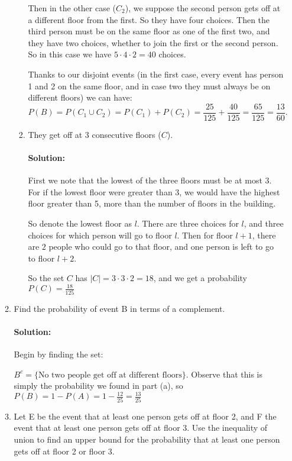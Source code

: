 \documentclass{article}
\begin{document}
\begin{enumerate}
\begin{enumerate}
\begin{enumerate}
                        Then in the other case ($C_2$), we suppose the second person gets off at a different floor from the first. So they have four choices. Then the third person must be on the same floor as one of the first two, and they have two choices, whether to join the first or the second person. So in this case we have $5\cdot 4\cdot 2=40$ choices.

                        Thanks to our disjoint events (in the first case, every event has person 1 and 2 on the same floor, and in case two they must always be on different floors) we can have:
                         \[
                        P(B)=P(C_1\cup C_2)=P(C_1)+P(C_2)=\frac{25}{125}+\frac{40}{125}=\frac{65}{125}=\frac{13}{60}
                        .\] 
                    \item They get off at 3 consecutive floors ($C$).
                        \paragraph{Solution: }First we note that the lowest of the three floors must be at most 3. For if the lowest floor were greater than 3, we would have the highest floor greater than 5, more than the number of floors in the building. 

                        So denote the lowest floor as $l$. There are three choices for $l$, and three choices for which person will go to floor $l$. Then for floor $l+1$, there are $2$ people who could go to that floor, and one person is left to go to floor $l+2$.

                        So the set $C$ has $|C|=3\cdot 3\cdot 2=18$, and we get a probability $P(C)=\frac{18}{125}$
                \end{enumerate}
            \item Find the probability of event B in terms of a complement.
                \paragraph{Solution: }Begin by finding the set: 

                $B^{c}=\{\text{No two people get off at different floors}\} $. 
                Observe that this is simply the probability we found in part (a), so $P(B)=1-P(A)=1-\frac{12}{25}=\frac{13}{25}$
            \item Let E be the event that at least one person gets off at floor 2, and F the event that at least one person gets off at floor 3. Use the inequality of union to find an upper bound for the probability that at least one person gets off at floor 2 or floor 3.

\end{enumerate}
\end{enumerate}
\end{document}
